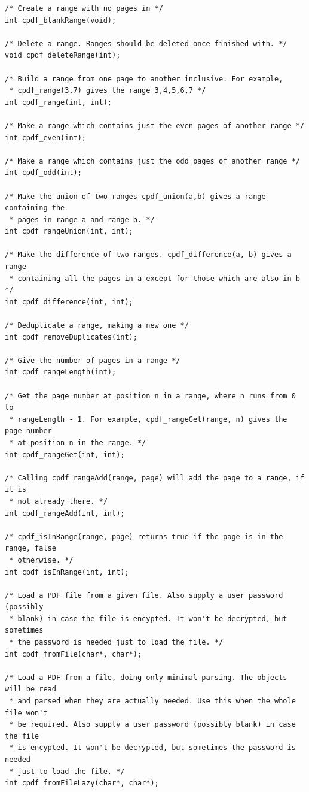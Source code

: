 \documentclass[a4paper]{memoir}
\begin{document}
\begin{small}
\begin{lstlisting}
/* Create a range with no pages in */
int cpdf_blankRange(void);

/* Delete a range. Ranges should be deleted once finished with. */
void cpdf_deleteRange(int);

/* Build a range from one page to another inclusive. For example,
 * cpdf_range(3,7) gives the range 3,4,5,6,7 */
int cpdf_range(int, int);

/* Make a range which contains just the even pages of another range */
int cpdf_even(int);

/* Make a range which contains just the odd pages of another range */
int cpdf_odd(int);

/* Make the union of two ranges cpdf_union(a,b) gives a range containing the
 * pages in range a and range b. */
int cpdf_rangeUnion(int, int);

/* Make the difference of two ranges. cpdf_difference(a, b) gives a range
 * containing all the pages in a except for those which are also in b */
int cpdf_difference(int, int);

/* Deduplicate a range, making a new one */
int cpdf_removeDuplicates(int);

/* Give the number of pages in a range */
int cpdf_rangeLength(int);

/* Get the page number at position n in a range, where n runs from 0 to
 * rangeLength - 1. For example, cpdf_rangeGet(range, n) gives the page number
 * at position n in the range. */
int cpdf_rangeGet(int, int);

/* Calling cpdf_rangeAdd(range, page) will add the page to a range, if it is
 * not already there. */
int cpdf_rangeAdd(int, int);

/* cpdf_isInRange(range, page) returns true if the page is in the range, false
 * otherwise. */
int cpdf_isInRange(int, int);

/* Load a PDF file from a given file. Also supply a user password (possibly
 * blank) in case the file is encypted. It won't be decrypted, but sometimes
 * the password is needed just to load the file. */
int cpdf_fromFile(char*, char*);

/* Load a PDF from a file, doing only minimal parsing. The objects will be read
 * and parsed when they are actually needed. Use this when the whole file won't
 * be required. Also supply a user password (possibly blank) in case the file
 * is encypted. It won't be decrypted, but sometimes the password is needed
 * just to load the file. */
int cpdf_fromFileLazy(char*, char*);


\end{lstlisting}
\end{small}
\end{document}
